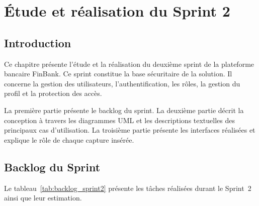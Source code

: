 \chapter{Étude et réalisation du Sprint 2}
\label{chap:sprint2}

\section{Introduction}
\label{sec:intro_sprint2}

Ce chapitre présente l'étude et la réalisation du deuxième sprint de la
plateforme bancaire FinBank. Ce sprint constitue la base sécuritaire de
la solution. Il concerne la gestion des utilisateurs, l'authentification,
les rôles, la gestion du profil et la protection des accès.

La première partie présente le backlog du sprint. La deuxième partie
décrit la conception à travers les diagrammes UML et les descriptions
textuelles des principaux cas d'utilisation. La troisième partie
présente les interfaces réalisées et explique le rôle de chaque capture
insérée.

\section{Backlog du Sprint}
\label{sec:backlog_sprint2}

Le tableau~\ref{tab:backlog_sprint2} présente les tâches réalisées
durant le Sprint~2 ainsi que leur estimation.

